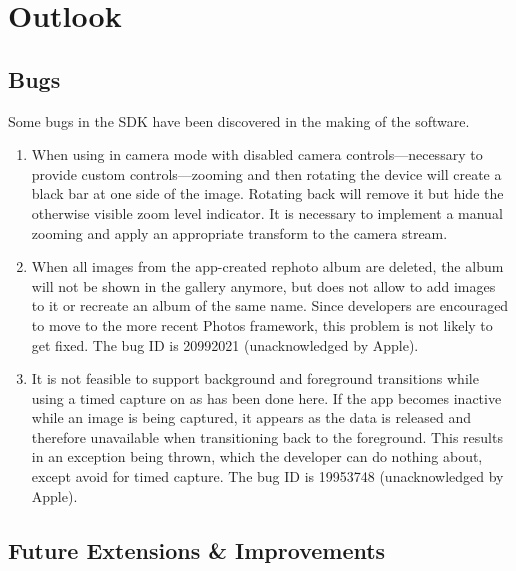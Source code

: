 \chapter{Outlook}

\section{Bugs}

Some bugs in the SDK have been discovered in the making of the software.
\begin{enumerate}

   \item When using  in camera mode with disabled
      camera controls---necessary to provide custom controls---zooming and then
      rotating the device will create a black bar at one side of the image.
      Rotating back will remove it but hide the otherwise visible zoom level
      indicator. It is necessary to implement a manual zooming and apply an
      appropriate transform to the camera stream.

   \item When all images from the app-created rephoto album are deleted, the
      album will not be shown in the gallery anymore, but 
      does not allow to add images to it or recreate an album of the same name.
      Since developers are encouraged to move to the more recent Photos
      framework, this problem is not likely to get fixed. The bug ID is
      20992021 (unacknowledged by Apple).

   \item It is not feasible to support background and foreground transitions
      while using a timed capture on  as has been
      done here. If the app becomes inactive while an image is being captured,
      it appears as the data is released and therefore unavailable when
      transitioning back to the foreground. This results in an exception being
      thrown, which the developer can do nothing about, except avoid
       for timed capture. The bug ID is 19953748
      (unacknowledged by Apple).
\end{enumerate}
\section{Future Extensions \& Improvements}

